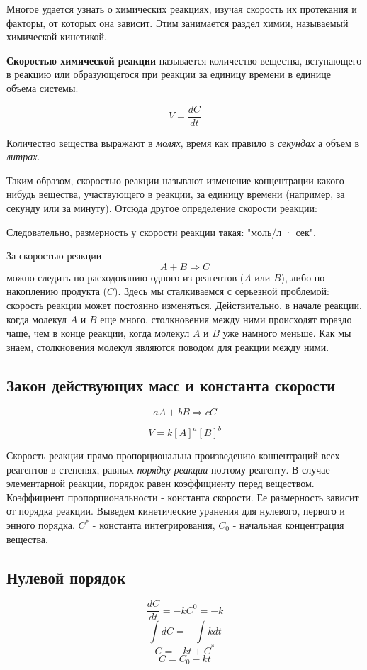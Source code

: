 \documentclass[14pt,a4paper]{scrartcl}
\begin{document}
Многое удается узнать о химических реакциях, изучая скорость их протекания и факторы, от которых она зависит. Этим занимается раздел химии, называемый химической кинетикой.

\textbf{Скоростью химической реакции} называется количество вещества, вступающего в реакцию или образующегося при реакции за единицу времени в единице объема системы.

$$V = \frac {dC}{dt}$$

Количество вещества выражают в \emph{молях}, время как правило в \emph{секундах} а объем в \emph{литрах}.

Таким образом, скоростью реакции называют изменение концентрации какого-нибудь вещества, участвующего в реакции, за единицу времени (например, за секунду или за минуту). Отсюда другое определение скорости реакции:

Следовательно, размерность у скорости реакции такая: "моль/л · сек".

За скоростью реакции $$A + B \Rightarrow C$$ можно следить по расходованию одного из реагентов ($A$ или $B$), либо по накоплению продукта ($C$). Здесь мы сталкиваемся с серьезной проблемой: скорость реакции может постоянно изменяться. Действительно, в начале реакции, когда молекул $A$ и $B$ еще много, столкновения между ними происходят гораздо чаще, чем в конце реакции, когда молекул $A$ и $B$ уже намного меньше. Как мы знаем, столкновения молекул являются поводом для реакции между ними. 

\subsection*{Закон действующих масс и константа скорости} 

$$aA + bB \Rightarrow cC$$

$$V = k \left[A\right]^a\left[B\right]^b$$


Скорость реакции прямо пропорциональна произведению концентраций всех реагентов в степенях, равных \emph{порядку реакции} поэтому реагенту. В случае элементарной реакции, порядок равен коэффициенту перед веществом. Коэффициент пропорциональности - константа скорости. Ее размерность зависит от порядка реакции. Выведем кинетические уранения для нулевого, первого и энного порядка. $C^*$ - константа интегрирования, $C_0$ - начальная концентрация вещества. 

\subsection*{Нулевой порядок}
$$\frac{dC}{dt} = -kC^0 = -k$$
$$\int dC = -\int kdt$$
$$C = -kt + C^*$$
$$C = C_0 - kt$$
\end{document}

